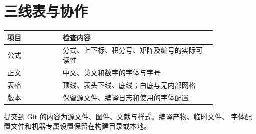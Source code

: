 \documentclass[UTF8,fontset=none,zihao=5]{ctexart}
\begin{document}
\section{三线表与协作}
\begin{reporttable}
\caption{排版检查项目}
\begin{tabular}{p{0.22\linewidth}p{0.61\linewidth}}
\toprule
项目 & 检查内容\\
\midrule
公式 & 分式、上下标、积分号、矩阵及编号的实际可读性\\
正文 & 中文、英文和数字的字体与字号\\
表格 & 顶线、表头下线、底线；白底与无内部网格\\
版本 & 保留源文件、编译日志和使用的字体配置\\
\bottomrule
\end{tabular}
\end{reporttable}

提交到 Git 的内容为源文件、图件、文献与样式。编译产物、临时文件、
字体配置文件和机器专属设置保留在构建目录或本地。
\end{document}
